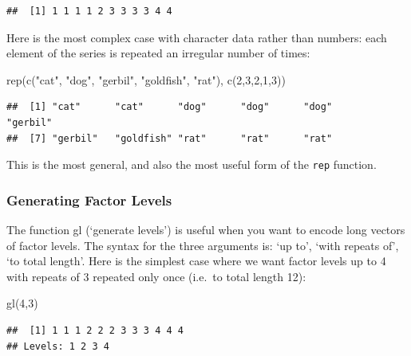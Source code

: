 \documentclass[
]{book}
\newenvironment{Shaded}{\begin{snugshade}}{\end{snugshade}}
\newcommand{\DecValTok}[1]{\textcolor[rgb]{0.00,0.00,0.81}{#1}}
\newcommand{\FunctionTok}[1]{\textcolor[rgb]{0.00,0.00,0.00}{#1}}
\newcommand{\NormalTok}[1]{#1}
\newcommand{\StringTok}[1]{\textcolor[rgb]{0.31,0.60,0.02}{#1}}
\begin{document}
\begin{verbatim}
##  [1] 1 1 1 1 2 3 3 3 3 4 4
\end{verbatim}

Here is the most complex case with character data rather than numbers: each element of the series is repeated an irregular number of times:

\begin{Shaded}
\begin{Highlighting}[]
\FunctionTok{rep}\NormalTok{(}\FunctionTok{c}\NormalTok{(}\StringTok{"cat"}\NormalTok{, }\StringTok{"dog"}\NormalTok{, }\StringTok{"gerbil"}\NormalTok{, }\StringTok{"goldfish"}\NormalTok{, }\StringTok{"rat"}\NormalTok{), }\FunctionTok{c}\NormalTok{(}\DecValTok{2}\NormalTok{,}\DecValTok{3}\NormalTok{,}\DecValTok{2}\NormalTok{,}\DecValTok{1}\NormalTok{,}\DecValTok{3}\NormalTok{))}
\end{Highlighting}
\end{Shaded}

\begin{verbatim}
##  [1] "cat"      "cat"      "dog"      "dog"      "dog"      "gerbil"  
##  [7] "gerbil"   "goldfish" "rat"      "rat"      "rat"
\end{verbatim}

This is the most general, and also the most useful form of the \texttt{rep} function.

\hypertarget{generating-factor-levels}{%
\subsubsection{Generating Factor Levels}\label{generating-factor-levels}}

The function gl (`generate levels') is useful when you want to encode long vectors of factor levels. The syntax for the three arguments is: `up to', `with repeats of', `to total length'. Here is the simplest case where we want factor levels up to 4 with repeats of 3 repeated only once (i.e.~to total length 12):

\begin{Shaded}
\begin{Highlighting}[]
\FunctionTok{gl}\NormalTok{(}\DecValTok{4}\NormalTok{,}\DecValTok{3}\NormalTok{)}
\end{Highlighting}
\end{Shaded}

\begin{verbatim}
##  [1] 1 1 1 2 2 2 3 3 3 4 4 4
## Levels: 1 2 3 4
\end{verbatim}
\end{document}
